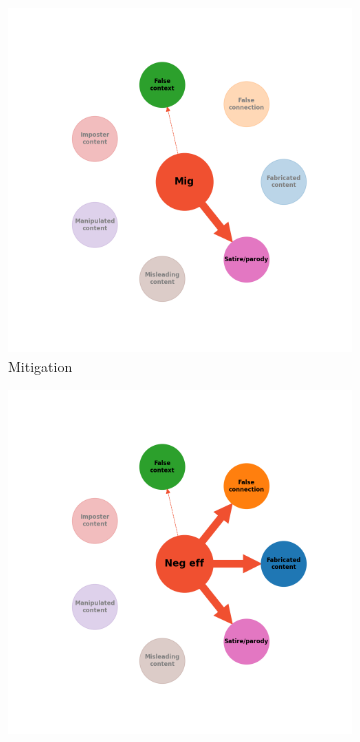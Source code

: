 \documentclass[twocolumn]{article}
\begin{document}
\begin{figure}
\begin{subfigure}{0.28\textwidth}
    \includegraphics[width=\textwidth]{rebuttal_Mig.png}
    \caption{Mitigation}
    \label{fig:rebuttal_mig}
\end{subfigure}
\hfill
\begin{subfigure}{0.28\textwidth}
    \includegraphics[width=\textwidth]{rebuttal_Neg_Eff.png}

\end{subfigure}
\end{figure}
\end{document}
